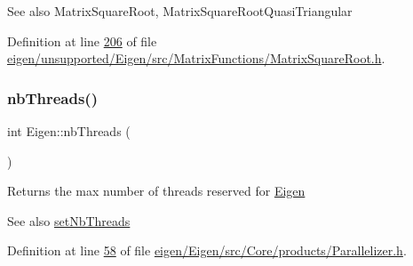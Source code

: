 \begin{DoxySeeAlso}{See also}
Matrix\+Square\+Root, Matrix\+Square\+Root\+Quasi\+Triangular 
\end{DoxySeeAlso}


Definition at line \hyperlink{eigen_2unsupported_2_eigen_2src_2_matrix_functions_2_matrix_square_root_8h_source_l00206}{206} of file \hyperlink{eigen_2unsupported_2_eigen_2src_2_matrix_functions_2_matrix_square_root_8h_source}{eigen/unsupported/\+Eigen/src/\+Matrix\+Functions/\+Matrix\+Square\+Root.\+h}.

\mbox{\label{namespace_eigen_a9aca97d83e21b91a04ec079360dfffeb}} 
\subsubsection{\texorpdfstring{nb\+Threads()}{nbThreads()}}
{\footnotesize\ttfamily int Eigen\+::nb\+Threads (\begin{DoxyParamCaption}{ }\end{DoxyParamCaption})\hspace{0.3cm}{\ttfamily [inline]}}

\begin{DoxyReturn}{Returns}
the max number of threads reserved for \hyperlink{namespace_eigen}{Eigen} 
\end{DoxyReturn}
\begin{DoxySeeAlso}{See also}
\hyperlink{namespace_eigen_af9cd17c2fe18204239cd11c88c120b50}{set\+Nb\+Threads} 
\end{DoxySeeAlso}


Definition at line \hyperlink{eigen_2_eigen_2src_2_core_2products_2_parallelizer_8h_source_l00058}{58} of file \hyperlink{eigen_2_eigen_2src_2_core_2products_2_parallelizer_8h_source}{eigen/\+Eigen/src/\+Core/products/\+Parallelizer.\+h}.

\mbox{\label{namespace_eigen_ad798a8be8b0c5f94a29b119898d8d83d}} 
